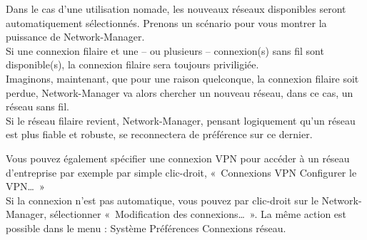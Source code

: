 \begin{nota}
Dans le cas d'une utilisation nomade, les nouveaux réseaux disponibles seront automatiquement sélectionnés. Prenons un scénario pour vous montrer la puissance de Network-Manager.\\
Si une connexion filaire et une -- ou plusieurs -- connexion(s) sans fil sont disponible(s), la connexion filaire sera toujours priviligiée.\\
Imaginons, maintenant, que pour une raison quelconque, la connexion filaire soit perdue, Network-Manager va alors chercher un nouveau réseau, dans ce cas, un réseau sans fil.\\
Si le réseau filaire revient, Network-Manager, pensant logiquement qu'un réseau  est plus fiable et robuste, se reconnectera de préférence sur ce dernier.\par
\GestionReseauNM
\end{nota}
Vous pouvez également spécifier une connexion VPN pour accéder à un réseau d'entreprise par exemple par simple clic-droit, «~Connexions VPN \FlecheDroite Configurer le VPN\ldots{}~»\\
Si la connexion n'est pas automatique, vous pouvez par clic-droit sur le Network-Manager, sélectionner «~Modification des connexions\ldots{}~». La même action est possible dans le menu : Système \FlecheDroite Préférences \FlecheDroite Connexions réseau.
